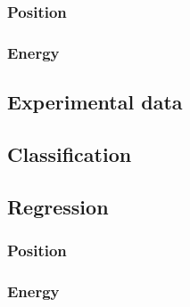 \subsubsection{Position}
\subsubsection{Energy}
\subsection{Experimental data}
\subsection{Classification}
\subsection{Regression}
\subsubsection{Position}
\subsubsection{Energy}
